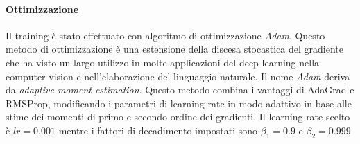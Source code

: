 \paragraph{Ottimizzazione} Il training è stato effettuato con algoritmo di ottimizzazione \textit{Adam}. Questo metodo di ottimizzazione è una estensione della discesa stocastica del gradiente che ha visto un largo utilizzo in molte applicazioni del deep learning nella computer vision e nell'elaborazione del linguaggio naturale. Il nome \textit{Adam} deriva da \textit{adaptive moment estimation}. Questo metodo combina i vantaggi di AdaGrad e RMSProp, modificando i parametri di learning rate in modo adattivo in base alle stime dei momenti di primo e secondo ordine dei gradienti. Il learning rate scelto è $lr=0.001$ mentre i fattori di decadimento impostati sono $\beta_1=0.9$ e $\beta_2=0.999$

